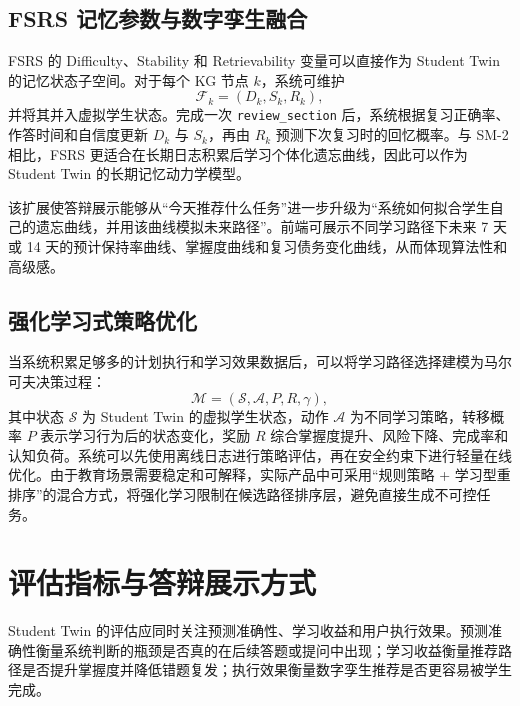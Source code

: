 \subsection{FSRS 记忆参数与数字孪生融合}

FSRS 的 Difficulty、Stability 和 Retrievability 变量可以直接作为 Student Twin 的记忆状态子空间。对于每个 KG 节点 $k$，系统可维护
\[
  \mathcal{F}_k=(D_k,S_k,R_k),
\]
并将其并入虚拟学生状态。完成一次 \texttt{review\_section} 后，系统根据复习正确率、作答时间和自信度更新 $D_k$ 与 $S_k$，再由 $R_k$ 预测下次复习时的回忆概率。与 SM-2 相比，FSRS 更适合在长期日志积累后学习个体化遗忘曲线，因此可以作为 Student Twin 的长期记忆动力学模型。

该扩展使答辩展示能够从“今天推荐什么任务”进一步升级为“系统如何拟合学生自己的遗忘曲线，并用该曲线模拟未来路径”。前端可展示不同学习路径下未来 7 天或 14 天的预计保持率曲线、掌握度曲线和复习债务变化曲线，从而体现算法性和高级感。

\subsection{强化学习式策略优化}

当系统积累足够多的计划执行和学习效果数据后，可以将学习路径选择建模为马尔可夫决策过程：
\begin{equation}
  \mathcal{M}=(\mathcal{S},\mathcal{A},P,R,\gamma),
\end{equation}
其中状态 $\mathcal{S}$ 为 Student Twin 的虚拟学生状态，动作 $\mathcal{A}$ 为不同学习策略，转移概率 $P$ 表示学习行为后的状态变化，奖励 $R$ 综合掌握度提升、风险下降、完成率和认知负荷。系统可以先使用离线日志进行策略评估，再在安全约束下进行轻量在线优化。由于教育场景需要稳定和可解释，实际产品中可采用“规则策略 + 学习型重排序”的混合方式，将强化学习限制在候选路径排序层，避免直接生成不可控任务。

\section{评估指标与答辩展示方式}

Student Twin 的评估应同时关注预测准确性、学习收益和用户执行效果。预测准确性衡量系统判断的瓶颈是否真的在后续答题或提问中出现；学习收益衡量推荐路径是否提升掌握度并降低错题复发；执行效果衡量数字孪生推荐是否更容易被学生完成。

